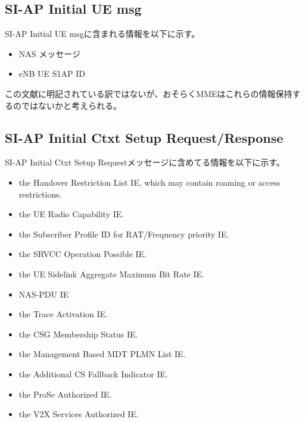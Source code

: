\documentclass[a4j]{ujarticle}
\begin{document}
\subsection{SI-AP Initial UE msg}
SI-AP Initial UE msgに含まれる情報を以下に示す。
\begin{itemize}
  \item NAS メッセージ
  \item eNB UE S1AP ID
\end{itemize}
この文献に明記されている訳ではないが、おそらくMMEはこれらの情報保持するのではないかと考えられる。


\subsection{SI-AP Initial Ctxt Setup Request/Response}
SI-AP Initial Ctxt Setup Requestメッセージに含めてる情報を以下に示す。
\begin{itemize}
  \item the Handover Restriction List IE, which may contain roaming or access restrictions.
  \item the UE Radio Capability IE.
  \item the Subscriber Profile ID for RAT/Frequency priority IE.
  \item the SRVCC Operation Possible IE.
  \item the UE Sidelink Aggregate Maximum Bit Rate IE.
  \item NAS-PDU IE
  \item the Trace Activation IE.
  \item the CSG Membership Status IE.
  \item the Management Based MDT PLMN List IE.
  \item the Additional CS Fallback Indicator IE.
  \item the ProSe Authorized IE.
  \item the V2X Services Authorized IE.
\end{itemize}
\end{document}
